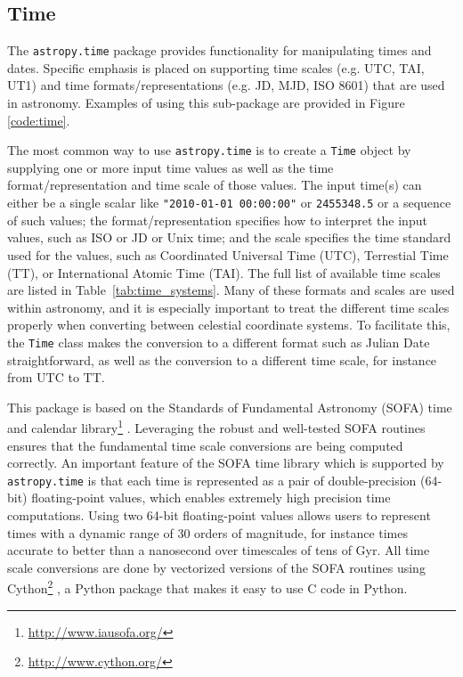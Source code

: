 \documentclass[traditabstract]{aa}
\begin{document}
\subsection{Time}

\label{sec:time}


The \texttt{astropy.time} package provides functionality for manipulating
times and dates. Specific emphasis is placed on supporting time scales (e.g.
UTC, TAI, UT1) and time formats/representations (e.g. JD, MJD, ISO 8601) that
are used in astronomy. Examples of using this sub-package are provided in Figure \ref{code:time}.

The most common way to use \texttt{astropy.time} is to create a \texttt{Time}
object by supplying one or more input time values as well as the time
format/representation and time scale of those values. The input time(s) can
either be a single scalar like \verb|"2010-01-01 00:00:00"| or
\verb|2455348.5| or a sequence of such values; the format/representation
specifies how to interpret the input values, such as ISO or JD or Unix time; and
the scale specifies the time standard used for the values, such as Coordinated Universal Time (UTC), Terrestial Time (TT), or International Atomic Time (TAI). The full list of available time scales are listed in Table~\ref{tab:time_systems}. Many of these formats and scales are used within astronomy, and it is especially important to treat the different time scales properly when converting between celestial coordinate systems.
To facilitate this, the \texttt{Time} class makes the conversion to a different format
such as Julian Date straightforward, as well as the conversion to a different time scale, for instance from UTC to TT.

This package is based on the Standards of Fundamental Astronomy (SOFA) time
and calendar library\footnote{\url{http://www.iausofa.org/}} \citep{sofa_wallace}. Leveraging the
robust and well-tested SOFA routines ensures that the fundamental time scale
conversions are being computed correctly. An important feature of the SOFA
time library which is supported by \texttt{astropy.time} is that each time is represented as a pair of double-precision (64-bit)
floating-point values, which enables extremely high precision time computations. Using two 64-bit floating-point values allows users to represent times with a dynamic range of 30 orders of magnitude, for instance times accurate to better than a nanosecond over timescales of tens of Gyr. All time scale conversions
are done by vectorized versions of the SOFA routines using Cython\footnote{\url{http://www.cython.org/}} \citep{cython}, a Python package that makes it easy to use C code in Python.
\end{document}

